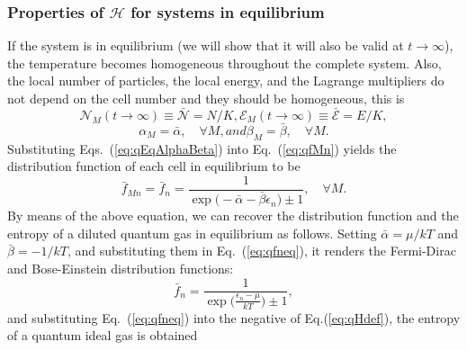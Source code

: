 \subsubsection{Properties of $\mathcal{H}$ for systems in equilibrium}
If the system is in equilibrium (we will show that it will also be valid at $t\to\infty$), the temperature becomes homogeneous throughout
the complete system. Also, the local number of particles, the local
energy, and the Lagrange multipliers do not depend on the cell number and they should be homogeneous,
this is 
%
\begin{subequations}\label{eq:qEqRestrictions}
\begin{equation}
   {\mathcal{N}}_M(t\to\infty)\equiv \bar{\mathcal{N}}=N/K,
\end{equation}
%
%
\begin{equation}
	{\mathcal{E}}_M(t\to\infty)\equiv \bar{\mathcal{E}}=E/K,
\end{equation}
\end{subequations}
%
%
\begin{subequations}\label{eq:qEqAlphaBeta}
\begin{equation}
	\alpha_M=\bar\alpha,\quad\forall M,
\end{equation}
%
and
\begin{equation}
	\beta_M=\bar\beta, \quad\forall M.
\end{equation}
\end{subequations}
%
Substituting Eqs.~(\ref{eq:qEqAlphaBeta}) into Eq.~(\ref{eq:qfMn}) yields the distribution
function of each cell in equilibrium to be
%
\begin{equation}\label{eq:qfneq}
    \bar f_{Mn}=\bar f_n =\frac{1}{\exp\big(-\bar\alpha-\bar\beta \epsilon_n\big)\pm 1},\quad\forall M.
\end{equation}
%
By means of the above equation, we can recover the distribution function and the entropy of a diluted quantum gas in equilibrium as follows. Setting $\bar\alpha=\mu/kT$ and $\bar\beta=-1/kT$,
and substituting them in Eq.~(\ref{eq:qfneq}), it renders the Fermi-Dirac and Bose-Einstein
distribution functions:
%
\begin{equation}
    \bar{f}_{n}=\frac{1}{\exp\big(\frac{{\epsilon_n}-\mu}{kT}\big)\pm 1},
\end{equation}
%
and substituting Eq.~(\ref{eq:qfneq}) into the negative of Eq.(\ref{eq:qHdef}), 
the entropy of a quantum ideal gas is obtained
